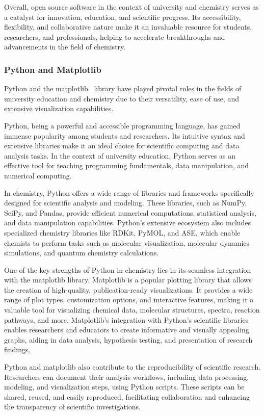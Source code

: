 \documentclass[../Master.tex]{subfiles}
\begin{document}
Overall, open source software in the context of university and chemistry serves as a catalyst for innovation, education, and scientific progress. Its accessibility, flexibility, and collaborative nature make it an invaluable resource for students, researchers, and professionals, helping to accelerate breakthroughs and advancements in the field of chemistry.

\subsubsection{Python and Matplotlib}\label{sec:py-plt}
Python and the matplotlib\ \cite{hunter_matplotlib_2007} library have played pivotal roles in the fields of university education and chemistry due to their versatility, ease of use, and extensive visualization capabilities.

Python, being a powerful and accessible programming language, has gained immense popularity among students and researchers. Its intuitive syntax and extensive libraries make it an ideal choice for scientific computing and data analysis tasks. In the context of university education, Python serves as an effective tool for teaching programming fundamentals, data manipulation, and numerical computing.

In chemistry, Python offers a wide range of libraries and frameworks specifically designed for scientific analysis and modeling. These libraries, such as NumPy, SciPy, and Pandas, provide efficient numerical computations, statistical analysis, and data manipulation capabilities. Python's extensive ecosystem also includes specialized chemistry libraries like RDKit, PyMOL, and ASE, which enable chemists to perform tasks such as molecular visualization, molecular dynamics simulations, and quantum chemistry calculations.

One of the key strengths of Python in chemistry lies in its seamless integration with the matplotlib library. Matplotlib is a popular plotting library that allows the creation of high-quality, publication-ready visualizations. It provides a wide range of plot types, customization options, and interactive features, making it a valuable tool for visualizing chemical data, molecular structures, spectra, reaction pathways, and more. Matplotlib's integration with Python's scientific libraries enables researchers and educators to create informative and visually appealing graphs, aiding in data analysis, hypothesis testing, and presentation of research findings.

Python and matplotlib also contribute to the reproducibility of scientific research. Researchers can document their analysis workflows, including data processing, modeling, and visualization steps, using Python scripts. These scripts can be shared, reused, and easily reproduced, facilitating collaboration and enhancing the transparency of scientific investigations.
\end{document}
